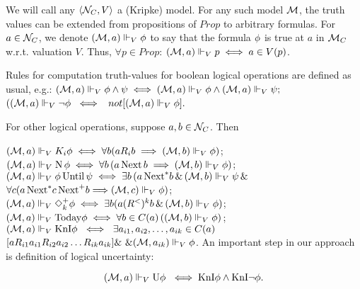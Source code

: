\documentclass[runningheads]{llncs}
\begin{document}
  We will call any
$\langle \mathcal{N}_C, V \rangle$ a (Kripke) model.
 For any such model $\mathcal{M}$, the truth values can be extended from
propositions of $Prop$ to arbitrary formulas.
 For $a\in \mathcal{N}_C$, we denote
$(\mathcal{M},a)\Vdash_V \phi$ to say that the formula $\phi$ is true at $a$ in
$\mathcal{M}_C$ w.r.t. valuation $V$. Thus, $\forall p\in Prop$:
$(\mathcal{M},a)\Vdash_V p \iff a\in V(p)$.



Rules for computation truth-values for  boolean logical operations
are defined as usual, e.g.:
\( (\mathcal{M},a)\Vdash_V \phi\wedge \psi \iff(\mathcal{M},a)\Vdash_V \phi \wedge
(\mathcal{M},a)\Vdash_V \psi; \)
\( ((\mathcal{M},a)\Vdash_V \neg \phi \ \iff \) \(\ not [(\mathcal{M},a)\Vdash_V \phi]. \)

For other logical operations, suppose $a,b\in \mathcal{N}_C$. Then

    \((\mathcal{M},a)\Vdash_V K_i \phi
      \iff \forall b (aR_i b\implies (\mathcal{M},b)\Vdash_V \phi)\);
\ \ \
    \((\mathcal{M},a)\Vdash_V \mathrm{N}\, \phi
      \iff \forall b\,
    (a \,\mathrm{Next}\, b \implies (\mathcal{M},b)\Vdash_V \phi)\);
\ \ \   \((\mathcal{M},a)\Vdash_V \phi\,\mathrm{Until}\, \psi
             \iff
    \exists b\, (a\,\mathrm{Next}^* b\,\&\, (\mathcal{M},b)\Vdash_V \psi
         \,\&\,\)
         \( \forall c (a\,\mathrm{Next}^* c \,\mathrm{Next}^+ b{\implies}
    (\mathcal{M},c)\Vdash_V \phi)\);
      \ \ \
\((\mathcal{M},a) \Vdash_V \Diamond^+_k\phi \iff
    \exists b ( a (R^<)^k b\,\&\, (\mathcal{M},b)\Vdash_V \phi)\);
\ \ \
\((\mathcal{M},a) \Vdash_V \mathrm{Today}\phi \iff
    \forall b\in C(a)\, ((\mathcal{M},b)\Vdash_V \phi)\);
\ \ \
        \((\mathcal{M},a)\Vdash_V \mbox{KnI}\phi \ \iff
  \ \exists a_{i1}, a_{i2}, \dots , a_{ik} \in C(a)\)
   \( [
  a R_{i1} a_{i1} R_{i2} a_{i2} \dots R_{ik} a_{ik}]
   \& \ \&  (\mathcal{M},a_{ik})\Vdash_V
\phi \).
An important step in our approach is definition of logical uncertainty:


\[(\mathcal{M},a)\Vdash_V \mbox{U} \phi  \  \iff  \mbox{KnI}\phi \wedge \mbox{KnI} \neg \phi.
\]
\end{document}
